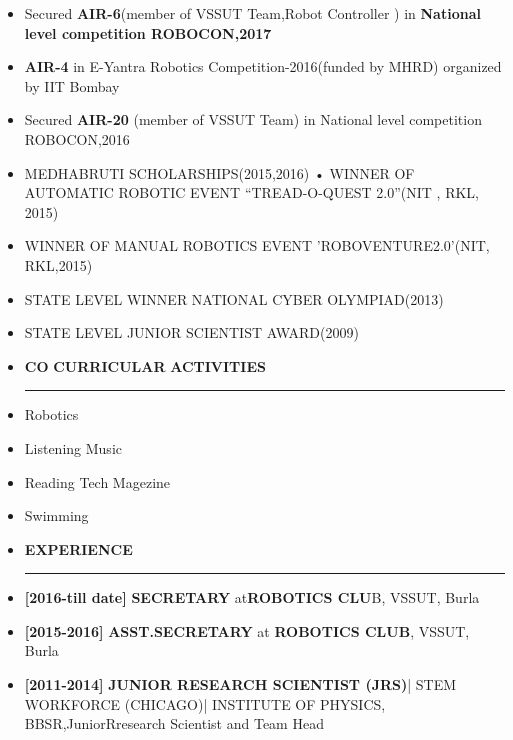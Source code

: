 \documentclass[a4paper]{article}
\begin{document}
 \renewcommand{\labelitemi}{\textbullet}
 \begin{itemize}
 \item Secured \textbf {AIR-6}(member of VSSUT Team,Robot Controller ) in \textbf {National level competition ROBOCON,2017} \item \textbf { AIR-4} in E-Yantra Robotics Competition-2016(funded by MHRD) organized by IIT Bombay \item Secured \textbf{ AIR-20} (member of VSSUT Team) in National level competition ROBOCON,2016 \item MEDHABRUTI SCHOLARSHIPS(2015,2016) • WINNER OF AUTOMATIC ROBOTIC EVENT “TREAD-O-QUEST 2.0”(NIT , RKL, 2015) \item WINNER OF MANUAL ROBOTICS EVENT ’ROBOVENTURE2.0’(NIT, RKL,2015) \item STATE LEVEL WINNER NATIONAL CYBER OLYMPIAD(2013) \item STATE LEVEL JUNIOR SCIENTIST AWARD(2009) 
  
 \end{itemize}
 
 \renewcommand{\labelitemi}{\texttt{[image: jnj.JPG]}}
\begin{itemize}
  \vspace{4ex}
  \item \textbf{\huge{C}}\textbf{\large O} \textbf{\huge{\-}} \textbf{\huge{C}}\textbf{\large URRICULAR} \textbf{\huge{A}}\textbf{\large CTIVITIES} 
  {\color{mypink1}
  \rule{\linewidth}{0.5mm}}
 \end{itemize}
 
 \renewcommand{\labelitemi}{\textbullet}
 \begin{itemize}
 \item Robotics \item Listening Music \item Reading Tech Magezine \item Swimming 
 
  
 \end{itemize}
 \renewcommand{\labelitemi}{\texttt{[image: jnj.JPG]}}
\begin{itemize}
  \vspace{4ex}
  \item \textbf{\huge{E}}\textbf{\large XPERIENCE} 
  {\color{mypink1}
  \rule{\linewidth}{0.5mm}}
 \end{itemize}

 \renewcommand{\labelitemi}{\textbullet}
 \begin{itemize}
\item \textbf {[2016-till date]}\textbf { SECRETARY }at\textbf {ROBOTICS CLU}B, VSSUT, Burla
\item \textbf {[2015-2016]}\textbf {  ASST.SECRETARY} at \textbf {ROBOTICS CLUB}, VSSUT, Burla 
\item \textbf {[2011-2014]} \textbf{JUNIOR RESEARCH SCIENTIST (JRS)}| STEM WORKFORCE (CHICAGO)|  INSTITUTE OF PHYSICS, BBSR,JuniorRresearch Scientist and Team Head 
 
 \end{itemize}
\end{document}
